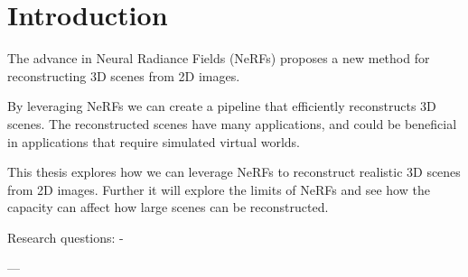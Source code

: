 \chapter{Introduction}

The advance in Neural Radiance Fields (NeRFs) proposes a new method for reconstructing 3D scenes from 2D images.

By leveraging NeRFs we can create a pipeline that efficiently reconstructs 3D scenes. The reconstructed scenes have many applications, and could be beneficial in applications that require simulated virtual worlds.

This thesis explores how we can leverage NeRFs to reconstruct realistic 3D scenes from 2D images. Further it will explore the limits of NeRFs and see how the capacity can affect how large scenes can be reconstructed.


Research questions:
- 

---



